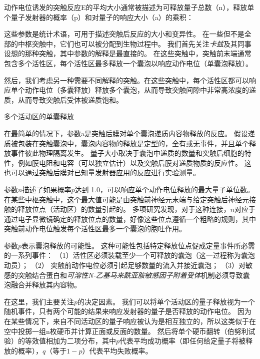 \begin{proposition}[突触强度取决于递质释放的概率和其他量子参数] \label{box:15_1}
	
	\quad \quad 动作电位诱发的突触反应E的平均大小通常被描述为可释放量子总数（n），释放单个量子发射器的概率（p）和对量子的响应大小（a）的乘积：
	
	\quad \quad 这些参数是统计术语，可用于描述突触后反应的大小和变异性。
	在一些但不是全部的中枢突触中，它们也可以被分配到生物过程中。
	我们首先关注\textit{卡兹}及其同事设想的那种突触，其中参数的解释是最直接的。
	在这些突触中，突触前末端通常包含多个活性区，每个活性区最多释放一个囊泡以响应动作电位（单囊泡释放）。
	
	\quad \quad 然后，我们考虑另一种需要不同解释的突触。在这些突触中，每个活性区都可以响应单个动作电位（多囊释放）释放多个囊泡，从而导致突触间隙中非常高浓度的递质，从而导致突触后受体被递质饱和。
	
	\quad \quad 多个活动区的单囊释放
	
	\quad \quad 在最简单的情况下，参数a是突触后膜对单个囊泡递质内容物释放的反应。
	假设递质被包装在突触囊泡中，囊泡内容物的释放是定型的，全有或无事件，并且单个释放事件彼此物理隔离发生。
	量子大小取决于囊泡中递质的数量和突触后细胞的特性，例如膜电阻和电容（可以独立估计）以及突触后膜对递质物质的反应性。
	这也可以通过突触后膜对已知量发射器应用的反应进行实验测量。
	
	\quad \quad 参数$ n $描述了如果概率$ p $达到 1.0，可以响应单个动作电位释放的最大量子单位数。
	在某些中枢突触中，这个最大值可能是由突触前神经元末端与给定突触后神经元接触的释放位点（活动区）的数量引起的。
	多项研究发现，对于这种连接，$ n $对应于通过电子显微镜确定的释放位点的数量，好像这些位点遵循一个粗略的规则，其中突触前动作电位触发每个活性区最多一个囊泡的胞吐作用。
	
	\quad \quad 参数$ p $表示囊泡释放的可能性。
	这种可能性包括特定释放位点促成定量事件所必需的一系列事件：
	（1）活性区必须装载至少一个可释放的囊泡（这一过程称为囊泡动员）；
	（2） 突触前动作电位必须引起足够数量的流入并接近囊泡；
	（3）对敏感的突触结合蛋白和\textit{可溶性N-乙基马来酰亚胺敏感因子附着受体}机制必须导致囊泡融合并释放其内容物。
	
	\quad \quad 在这里，我们主要关注$ p $的决定因素。
	我们可以将单个活动区的量子释放视为一个随机事件，只有两个可能的结果来响应发射器的量子是否释放的动作电位。
	因为在某些情况下，来自不同活动区的量子响应被认为是相互独立的，所以这类似于在空中投掷一组n枚硬币并计算正面或反面的数量。
	然后将单个硬币翻转（伯努利试验）的等效值相加为二项分布，其中$ p $代表平均成功概率（即任何给定量子将被释放的概率），$ q $（等于$ 1-p $）代表平均失败概率。
	

\end{proposition}
